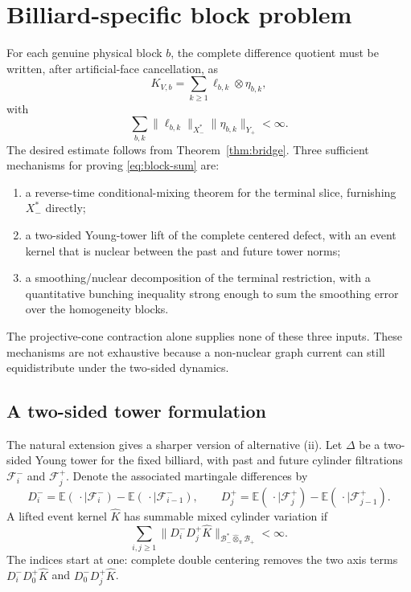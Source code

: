 \documentclass[11pt]{article}
\begin{document}
\section{Billiard-specific block problem}

For each genuine physical block $b$, the complete difference quotient must be
written, after artificial-face cancellation, as
\begin{equation}
\label{eq:block-kernel}
 K_{V,b}=\sum_{k\ge1}\ell_{b,k}\otimes\eta_{b,k},
\end{equation}
with
\begin{equation}
\label{eq:block-sum}
 \sum_{b,k}\|\ell_{b,k}\|_{X_-^*}
             \|\eta_{b,k}\|_{Y_+}<\infty.
\end{equation}
The desired estimate follows from Theorem~\ref{thm:bridge}.  Three sufficient
mechanisms for proving \eqref{eq:block-sum} are:
\begin{enumerate}[label=\textup{(\roman*)}]
\item a reverse-time conditional-mixing theorem for the terminal slice,
      furnishing $X_-^*$ directly;
\item a two-sided Young-tower lift of the complete centered defect, with an
      event kernel that is nuclear between the past and future tower norms;
\item a smoothing/nuclear decomposition of the terminal restriction, with a
      quantitative bunching inequality strong enough to sum the smoothing
      error over the homogeneity blocks.
\end{enumerate}
The projective-cone contraction alone supplies none of these three inputs.
These mechanisms are not exhaustive because a non-nuclear graph current can
still equidistribute under the two-sided dynamics.

\subsection{A two-sided tower formulation}

The natural extension gives a sharper version of alternative (ii).  Let
$\Delta$ be a two-sided Young tower for the fixed billiard, with past and
future cylinder filtrations $\mathcal F_i^-$ and $\mathcal F_j^+$.  Denote
the associated martingale differences by
\[
 D_i^-=\mathbb E(\,\cdot\mid\mathcal F_i^-)
       -\mathbb E(\,\cdot\mid\mathcal F_{i-1}^-),
 \qquad
 D_j^+=\mathbb E(\,\cdot\mid\mathcal F_j^+)
       -\mathbb E(\,\cdot\mid\mathcal F_{j-1}^+).
\]
A lifted event kernel $\widehat K$ has summable mixed cylinder variation if
\begin{equation}
\label{eq:mixed-cylinder}
 \sum_{i,j\ge1}
 \|D_i^-D_j^+\widehat K\|_{\mathcal B_-^*\widehat\otimes_\pi
                                      \mathcal B_+}<\infty.
\end{equation}
The indices start at one: complete double centering removes the two axis
terms $D_i^-D_0^+\widehat K$ and $D_0^-D_j^+\widehat K$.
\end{document}
